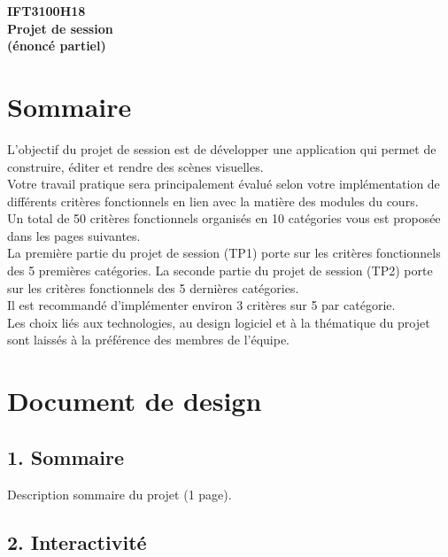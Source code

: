 \documentclass[12pt]{article}
\newcommand{\state}{\noindent}
\newcommand{\substate}{\nolinebreak}
\begin{document}
\begin{center}
  \scriptsize
  \textbf{IFT3100H18\\}
  \textbf{Projet de session\\}
  \textbf{(énoncé partiel)\\}
\end{center}

\section*{Sommaire}

\state
L'objectif du projet de session est de développer une application qui permet de construire, éditer et rendre des scènes visuelles.\\

\state
Votre travail pratique sera principalement évalué selon votre implémentation de différents critères fonctionnels en lien avec la matière des modules du cours. \\

\state
Un total de 50 critères fonctionnels organisés en 10 catégories vous est proposée dans les pages suivantes. \\

\state
La première partie du projet de session (TP1) porte sur les critères fonctionnels des 5 premières catégories.
\substate
La seconde partie du projet de session (TP2) porte sur les critères fonctionnels des 5 dernières catégories. \\

\state
Il est recommandé d'implémenter environ 3 critères sur 5 par catégorie. \\

\state
Les choix liés aux technologies, au design logiciel et à la thématique du projet sont laissés à la préférence des membres de l'équipe. \\

\pagebreak

\section*{Document de design}

\subsection*{1. Sommaire}

\state
Description sommaire du projet (1 page).

\subsection*{2. Interactivité}
\end{document}
